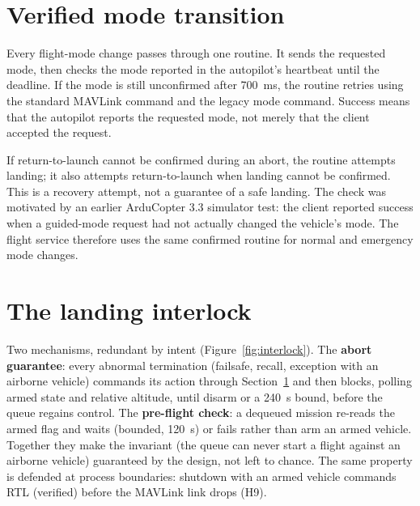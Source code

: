 \documentclass[12pt,a4paper]{report}
\begin{document}
\section{Verified mode transition}
\label{sec:verifiedmode}

Every flight-mode change passes through one routine. It sends the
requested mode, then checks the mode reported in the autopilot's
heartbeat until the deadline. If the mode is still unconfirmed after
700~ms, the routine retries using the standard MAVLink command and the
legacy mode command. Success means that the autopilot reports the
requested mode, not merely that the client accepted the request.

If return-to-launch cannot be confirmed during an abort, the routine
attempts landing; it also attempts return-to-launch when landing cannot
be confirmed. This is a recovery attempt, not a guarantee of a safe
landing. The check was motivated by an earlier ArduCopter 3.3 simulator
test: the client reported success when a guided-mode request had not
actually changed the vehicle's mode. The flight service therefore uses
the same confirmed routine for normal and emergency mode changes.

\section{The landing interlock}
\label{sec:interlock}

Two mechanisms, redundant by intent (Figure~\ref{fig:interlock}). The
\textbf{abort guarantee}: every abnormal termination (failsafe,
recall, exception with an airborne vehicle) commands its action
through Section~\ref{sec:verifiedmode} and then blocks, polling armed
state and relative altitude, until disarm or a 240~s bound, before
the queue regains control. The \textbf{pre-flight check}: a dequeued
mission re-reads the armed flag and waits (bounded, 120~s) or fails
rather than arm an armed vehicle. Together they make the invariant
(the queue can never start a flight against an airborne
vehicle) guaranteed by the design, not left to chance. The same
property is
defended at process boundaries: shutdown with an armed vehicle
commands RTL (verified) before the MAVLink link drops (H9).
\end{document}

